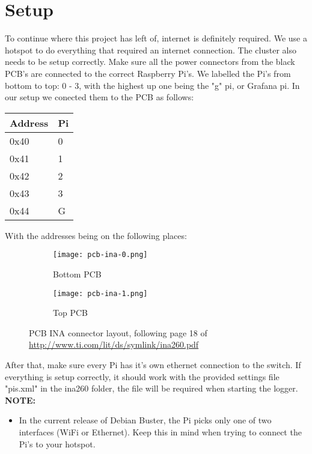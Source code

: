 \section{Setup}
To continue where this project has left of, internet is definitely required. We use a hotspot to do everything that required an internet connection.\newline
The cluster also needs to be setup correctly. Make sure all the power connectors from the black PCB's are connected to the correct Raspberry Pi's. We labelled the Pi's from bottom to top: 0 - 3, with the highest up one being the "g" pi, or Grafana pi. In our setup we conected them to the PCB as follows:
\begin{table}[h]
\centering
\begin{tabular}{|l|l|}
\hline
Address & Pi \\ \hline
0x40 & 0 \\ \hline
0x41 & 1 \\ \hline
0x42 & 2 \\ \hline
0x43 & 3 \\ \hline
0x44 & G \\ \hline
\end{tabular}
\end{table}
\newline
With the addresses being on the following places:
\begin{figure}[h]
	\centering
	\begin{subfigure}[b]{0.4\linewidth}
    		\texttt{[image: pcb-ina-0.png]}
    		\caption{Bottom PCB}
    	\end{subfigure}
    \begin{subfigure}[b]{0.4\linewidth}
    		\texttt{[image: pcb-ina-1.png]}
    		\caption{Top PCB}
    \end{subfigure}
    \caption{PCB INA connector layout, following page 18 of \url{http://www.ti.com/lit/ds/symlink/ina260.pdf}}
    \label{inapcb}
\end{figure}\newline
After that, make sure every Pi has it's own ethernet connection to the switch. If everything is setup correctly, it should work with the provided settings file "pis.xml" in the ina260 folder, the file will be required when starting the logger.\newline
\newline
\textbf{NOTE:}
\begin{itemize}
	\item In the current release of Debian Buster, the Pi picks only one of two interfaces (WiFi or Ethernet). Keep this in mind when trying to connect the Pi's to your hotspot.
\end{itemize}
